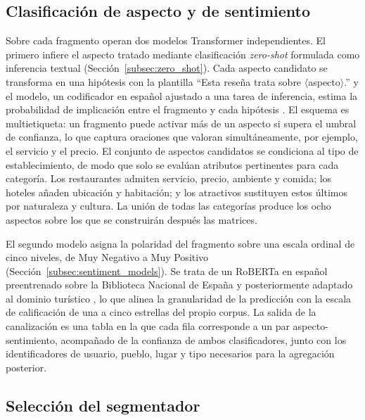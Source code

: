 \subsection*{Clasificación de aspecto y de sentimiento}

Sobre cada fragmento operan dos modelos Transformer independientes. El primero infiere el
aspecto tratado mediante clasificación \textit{zero-shot} formulada como inferencia textual
(Sección~\ref{subsec:zero_shot}). Cada aspecto candidato se transforma en una hipótesis con la
plantilla ``Esta reseña trata sobre $\langle$aspecto$\rangle$.'' y el modelo, un codificador
en español ajustado a una tarea de inferencia, estima la probabilidad de implicación entre el
fragmento y cada hipótesis \citep{yin_benchmarking_2019}. El esquema es multietiqueta: un
fragmento puede activar más de un aspecto si supera el umbral de confianza, lo que captura
oraciones que valoran simultáneamente, por ejemplo, el servicio y el precio. El conjunto de
aspectos candidatos se condiciona al tipo de establecimiento, de modo que solo se evalúan
atributos pertinentes para cada categoría. Los restaurantes admiten servicio, precio, ambiente
y comida; los hoteles añaden ubicación y habitación; y los atractivos sustituyen estos últimos
por naturaleza y cultura. La unión de todas las categorías produce los ocho aspectos sobre los
que se construirán después las matrices.

El segundo modelo asigna la polaridad del fragmento sobre una escala ordinal de cinco niveles,
de Muy Negativo a Muy Positivo (Sección~\ref{subsec:sentiment_models}). Se trata de un RoBERTa
en español preentrenado sobre la Biblioteca Nacional de España y posteriormente adaptado al
dominio turístico \citep{liu2019roberta}, lo que alinea la granularidad de la predicción con la
escala de calificación de una a cinco estrellas del propio corpus. La salida de la canalización
es una tabla en la que cada fila corresponde a un par aspecto-sentimiento, acompañado de la
confianza de ambos clasificadores, junto con los identificadores de usuario, pueblo, lugar y
tipo necesarios para la agregación posterior.

\subsection*{Selección del segmentador}

